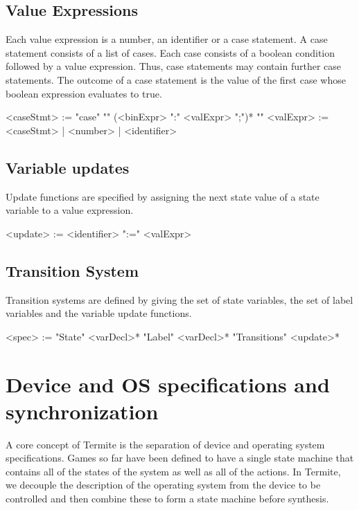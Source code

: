 \subsection{Value Expressions}
Each value expression is a number, an identifier or a case statement. A case statement consists of a list of cases. Each case consists of a boolean condition followed by a value expression. Thus, case statements may contain further case statements. The outcome of a case statement is the value of the first case whose boolean expression evaluates to true.

\begin{bnflisting}
    <caseStmt> := "case" "{" 
                      (<binExpr> ":" <valExpr> ";")*
                  "}"
    <valExpr>  := <caseStmt> | <number> | <identifier>
\end{bnflisting}

\subsection{Variable updates}

Update functions are specified by assigning the next state value of a state variable to a value expression.

\begin{bnflisting}
    <update>   := <identifier> ":=" <valExpr>
\end{bnflisting}

\subsection{Transition System}

Transition systems are defined by giving the set of state variables, the set of label variables and the variable update functions.

\begin{bnflisting}
    <spec>     := "State" <varDecl>* 
                  "Label" <varDecl>* 
                  "Transitions" <update>*
\end{bnflisting}

\section{Device and OS specifications and synchronization}

A core concept of Termite is the separation of device and operating system specifications. Games so far have been defined to have a single state machine that contains all of the states of the system as well as all of the actions. In Termite, we decouple the description of the operating system from the device to be controlled and then combine these to form a state machine before synthesis.

